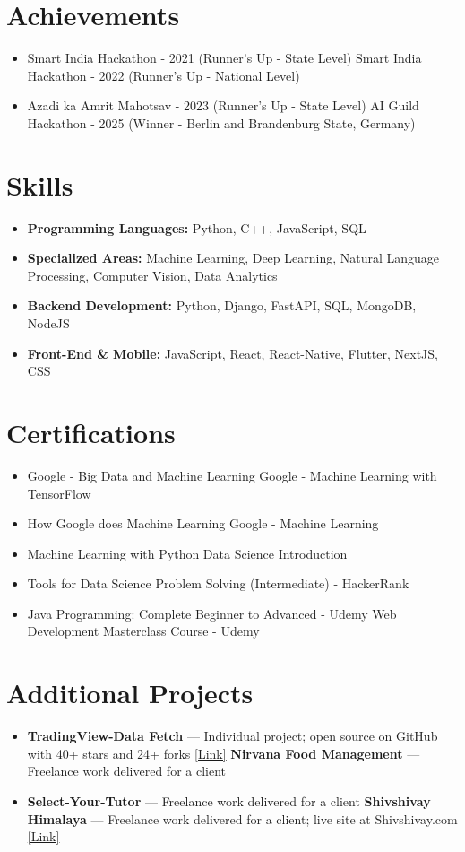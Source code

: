 \documentclass[a4paper,10pt]{article}
\begin{document}
\section*{Achievements}
\begin{itemize}
\item Smart India Hackathon - 2021 (Runner's Up - State Level) \hfill Smart India Hackathon - 2022 (Runner's Up - National Level)
\item Azadi ka Amrit Mahotsav - 2023 (Runner's Up - State Level) \hfill AI Guild Hackathon - 2025 (Winner - Berlin and Brandenburg State, Germany)
\end{itemize}

\section*{Skills}
\begin{itemize}
  \item \textbf{Programming Languages:} Python, C++, JavaScript, SQL
  \item \textbf{Specialized Areas:} Machine Learning, Deep Learning, Natural Language Processing, Computer Vision, Data Analytics
  \item \textbf{Backend Development:} Python, Django, FastAPI, SQL, MongoDB, NodeJS
  \item \textbf{Front-End \& Mobile:} JavaScript, React, React-Native, Flutter, NextJS, CSS
\end{itemize}

\section*{Certifications}
\begin{itemize}
\item Google - Big Data and Machine Learning \hfill Google - Machine Learning with TensorFlow
\item How Google does Machine Learning \hfill Google - Machine Learning
\item Machine Learning with Python \hfill Data Science Introduction
\item Tools for Data Science \hfill Problem Solving (Intermediate) - HackerRank
\item Java Programming: Complete Beginner to Advanced - Udemy \hfill Web Development Masterclass Course - Udemy
\end{itemize}

\section*{Additional Projects}
\begin{itemize}
\item \textbf{TradingView-Data Fetch} — Individual project; open source on GitHub with 40+ stars and 24+ forks \href{https://github.com/ravalmeet/TradingView}{[Link]} \hfill \textbf{Nirvana Food Management} — Freelance work delivered for a client
\item \textbf{Select-Your-Tutor} — Freelance work delivered for a client \hfill \textbf{Shivshivay Himalaya} — Freelance work delivered for a client; live site at Shivshivay.com \href{Shivshivay.com}{[Link]}
\end{itemize}
\end{document}
